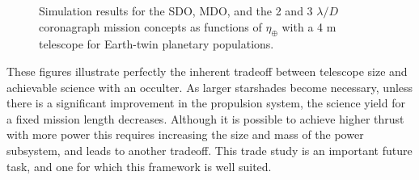\begin{figure}[ht]
\begin{center}
\begin{tabular}{c c}
  \end{tabular}
 \end{center}
 \caption[4 m telescope comparison]{ \label{fig:compinsts4m} Simulation results for the SDO, MDO, and the 2 and 3 $\lambda/D$ coronagraph mission concepts as functions of $\eta_\oplus$ with a 4 m telescope for Earth-twin planetary populations.}
 \end{figure}
 
 These figures illustrate perfectly the inherent tradeoff between telescope size and achievable science with an occulter.  As larger starshades become necessary, unless there is a significant improvement in the propulsion system, the science yield for a fixed mission length decreases.  Although it is possible to achieve higher thrust with more power this requires increasing the size and mass of the power subsystem, and leads to another tradeoff.  This trade study is an important future task, and one for which this framework is well suited.
 
